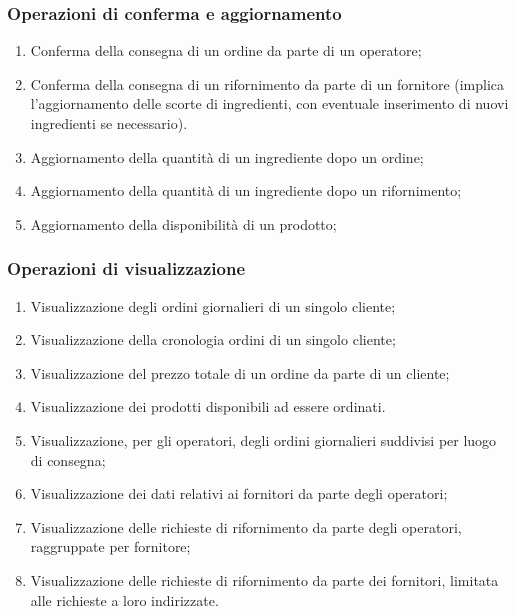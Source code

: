 \documentclass[12pt,a4paper]{article}
\begin{document}
    \subsubsection{Operazioni di conferma e aggiornamento}
    \begin{enumerate}[leftmargin=2.8em,label=\textbf{Op.\arabic*}]
        \item Conferma della consegna di un ordine da parte di un operatore;
        \item Conferma della consegna di un rifornimento da parte di un fornitore (implica l'aggiornamento delle scorte di ingredienti, con eventuale inserimento di nuovi ingredienti se necessario).
        \item Aggiornamento della quantità di un ingrediente dopo un ordine;
        \item Aggiornamento della quantità di un ingrediente dopo un rifornimento;
        \item Aggiornamento della disponibilità di un prodotto;
    \end{enumerate}

    \subsubsection{Operazioni di visualizzazione}
    \begin{enumerate}[leftmargin=2.8em,label=\textbf{Op.\arabic*}]
        \item Visualizzazione degli ordini giornalieri di un singolo cliente;
        \item Visualizzazione della cronologia ordini di un singolo cliente;
        \item Visualizzazione del prezzo totale di un ordine da parte di un cliente;
        \item Visualizzazione dei prodotti disponibili ad essere ordinati.
        \item Visualizzazione, per gli operatori, degli ordini giornalieri suddivisi per luogo di consegna;
        \item Visualizzazione dei dati relativi ai fornitori da parte degli operatori;
        \item Visualizzazione delle richieste di rifornimento da parte degli operatori, raggruppate per fornitore;
        \item Visualizzazione delle richieste di rifornimento da parte dei fornitori, limitata alle richieste a loro indirizzate.
    \end{enumerate}
\end{document}
